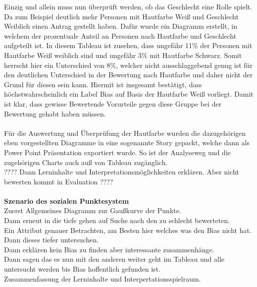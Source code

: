 \begin{onehalfspace}
Einzig und allein muss nun überprüft werden, ob das Geschlecht eine Rolle spielt. Da zum Beispiel deutlich mehr Personen mit Hautfarbe Wei{\ss} und Geschlecht Weiblich einen Antrag gestellt haben. Dafür wurde ein Diagramm erstellt, in welchem der prozentuale Anteil an Personen nach Hautfarbe und Geschlecht aufgeteilt ist. In diesem Tableau ist zusehen, dass ungefähr 11\% der Personen mit Hautfarbe Wei{\ss} weiblich sind und ungefähr 3\% mit Hautfarbe Schwarz. Somit herrscht hier ein Unterschied von 8\%, welcher nicht ausschlaggebend genug ist für den deutlichen Unterschied in der Bewertung nach Hautfarbe und daher nicht der Grund für diesen sein kann. Hiermit ist insgesamt bestätigt, dass höchstwahrscheinlich ein Label Bias auf Basis der Hautfarbe Wei{\ss} vorliegt. Damit ist klar, dass gewisse Bewertende Vorurteile gegen diese Gruppe bei der Bewertung gehabt haben müssen.\\\\
Für die Auswertung und Überprüfung der Hautfarbe wurden die dazugehörigen eben vorgestellten Diagramme in eine sogenannte Story gepackt, welche dann als Power Point Präsentation exportiert wurde. So ist der Analyseweg und die zugehörigen Charts auch au{\ss} von Tableau zugänglich.\\
???? Dann Lerninhalte und Interpretationsmöglichkeiten erklären. Aber nicht bewerten kommt in Evaluation ???? \\\\
\textbf{Szenario des sozialen Punktesystem}\\


Zuerst Allgemeines Diagramm zur Gaußkurve der Punkte.\\
Dann erneut in die tiefe gehen auf Suche nach den zu schlecht bewerteten.\\
Ein Attribut genauer Betrachten, am Besten hier welches was den Bias nicht hat.\\
Dann dieses tiefer untersuchen.\\
Dann erklären kein Bias zu finden aber interessante zusammenhänge.\\
Dann sagen das es nun mit den anderen weiter geht im Tableau und alle untersucht werden bis Bias hoffentlich gefunden ist.\\
Zusammenfassung der Lerninhalte und Interpertationsspielraum.
\newpage

\end{onehalfspace}
